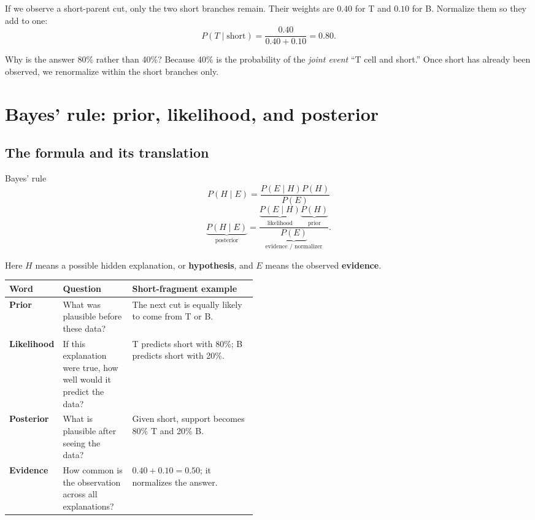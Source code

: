 \documentclass[11pt]{article}
\newcommand{\term}[1]{\textbf{\color{tealdark}#1}}
\begin{document}
If we observe a short-parent cut, only the two short branches remain. Their weights
are \(0.40\) for T and \(0.10\) for B. Normalize them so they add to one:
\[
P(T\mid\text{short})=\frac{0.40}{0.40+0.10}=0.80.
\]

\begin{checkpoint}
Why is the answer 80\% rather than 40\%? Because 40\% is the probability of the
\emph{joint event} “T cell and short.” Once short has already been observed, we
renormalize within the short branches only.
\end{checkpoint}

\section{Bayes' rule: prior, likelihood, and posterior}

\subsection{The formula and its translation}

\begin{mathbox}{Bayes' rule}
\[
\boxed{
P(H\mid E)
=
\frac{P(E\mid H)P(H)}{P(E)}
}
\]
\[
\underbrace{P(H\mid E)}_{\text{posterior}}
=
\frac{
\underbrace{P(E\mid H)}_{\text{likelihood}}
\underbrace{P(H)}_{\text{prior}}
}{
\underbrace{P(E)}_{\text{evidence / normalizer}}
}.
\]
\end{mathbox}

Here \(H\) means a possible hidden explanation, or \term{hypothesis}, and \(E\)
means the observed \term{evidence}.

\begin{center}
\begin{tabularx}{0.95\linewidth}{L{0.18\linewidth}L{0.29\linewidth}X}
\toprule
Word & Question & Short-fragment example \\
\midrule
\term{Prior} & What was plausible before these data? & The next cut is equally likely to come from T or B. \\
\term{Likelihood} & If this explanation were true, how well would it predict the data? & T predicts short with 80\%; B predicts short with 20\%. \\
\term{Posterior} & What is plausible after seeing the data? & Given short, support becomes 80\% T and 20\% B. \\
\term{Evidence} & How common is the observation across all explanations? & \(0.40+0.10=0.50\); it normalizes the answer. \\
\bottomrule
\end{tabularx}
\end{center}
\end{document}
